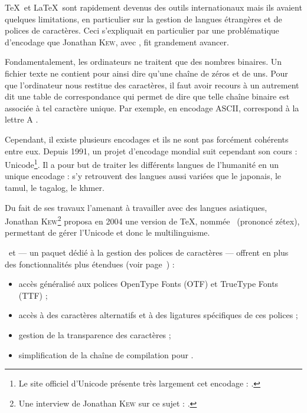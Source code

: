 \TeX\ et \LaTeX\ sont rapidement devenus des outils internationaux mais ils avaient quelques limitations, en particulier sur la gestion de langues étrangères et de polices de caractères. Ceci s'expliquait en particulier par une problématique d'encodage que Jonathan \textsc{Kew}, avec \XeTeX, fit grandement avancer.

Fondamentalement, les ordinateurs ne traitent que des nombres binai\-res. Un fichier texte ne contient pour ainsi dire qu'une chaîne de zéros et de uns. Pour que l'ordinateur nous restitue des caractères, il faut avoir recours à un  autrement dit une table de correspondance qui permet de dire que telle chaîne binaire est associée à tel caractère unique. Par exemple, en encodage ASCII,  \fg{} correspond à la lettre \og A \fg{}. 

Cependant, il existe plusieurs encodages et ils ne sont pas forcément cohérents entre eux. Depuis 1991, un projet d'encodage mondial suit cependant son cours : Unicode\footnote{Le site officiel d'Unicode présente très largement cet encodage : .}. Il a pour but de traiter les différents langues de l'humanité en un unique encodage : s'y retrouvent des langues aussi variées que le japonais, le tamul, le tagalog, le khmer.%

Du fait de ses travaux l'amenant à travailler avec des langues asiatiques, Jonathan \textsc{Kew}\footnote{Une interview de Jonathan \textsc{Kew} sur ce sujet : .} proposa en 2004 une version de \TeX, nommée \XeTeX\ (prononcé \og zétex\fg), permettant de gérer l'Unicode et donc le multilinguisme.

\XeTeX\ et  --- un paquet dédié à la gestion des polices de caractères --- offrent en plus des fonctionnalités plus étendues (voir page~\pageref{fontes}) :
\begin{itemize}
\item accès généralisé aux polices OpenType Fonts (OTF) et TrueType Fonts (TTF) ;
\item accès à des caractères alternatifs et à des ligatures spécifiques de ces polices ;
\item gestion de la transparence des caractères ;
\item simplification de la chaîne de compilation pour .
\end{itemize}

